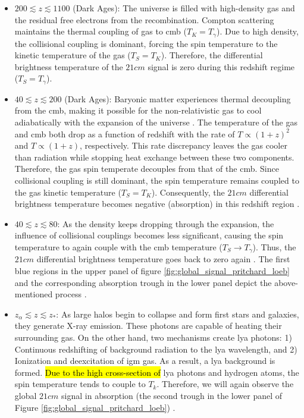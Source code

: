 \documentclass[12pt, TexShade, letterpaper]{report}
\begin{document}
\begin{itemize}
\item $200 \lesssim z \lesssim 1100$ (Dark Ages): The universe is filled with high-density gas and the residual free electrons from the recombination. Compton scattering maintains the thermal coupling of gas to \gls{cmb} ($T_K = T_\gamma$). Due to high density, the collisional coupling is dominant, forcing the spin temperature to the kinetic temperature of the gas ($T_S = T_K$). 
Therefore, the differential brightness temperature of the $21cm$ signal is zero during this redshift regime ($T_S = T_\gamma$)\cite{21century}.\par

\item $40 \lesssim z \lesssim 200$ (Dark Ages): Baryonic matter experiences thermal decoupling from the \gls{cmb}, making it possible for the non-relativistic gas to cool adiabatically with the expansion of the universe \cite{21century}. The temperature of the gas and \gls{cmb} both drop as a function of redshift with the rate of $T\propto (1+z)^{2}$ and $T\propto (1+z)$, respectively. This rate discrepancy leaves the gas cooler than radiation while stopping heat exchange between these two components. Therefore, the gas spin temperate decouples from that of the \gls{cmb}. Since collisional coupling is still dominant, the spin temperature remains coupled to the gas kinetic temperature ($T_S = T_K$). Consequently, the $21cm$ differential brightness temperature becomes negative (absorption) in this redshift region \cite{map_universe, 21century}.\par

\item $40 \lesssim z \lesssim 80$: As the density keeps dropping through the expansion, the influence of collisional couplings becomes less significant, causing the spin temperature to again couple with the \gls{cmb} temperature ($T_S \rightarrow T_\gamma$). Thus, the $21cm$ differential brightness temperature goes back to zero again \cite{map_universe}. The first blue regions in the upper panel of figure \ref{fig:global_signal_pritchard_loeb} and the corresponding absorption trough in the lower panel depict the above-mentioned process \cite{map_universe, 21century}.\par

\item $z_\alpha \lesssim z \lesssim z_*$: As large halos begin to collapse and form first stars and galaxies, they generate X-ray emission. These photons are capable of heating their surrounding gas. On the other hand, two mechanisms create \gls{lya} photons: 1) Continuous redshifting of background radiation to the \gls{lya} wavelength, and 2) Ionization and deexcitation of \gls{igm} gas. As a result, a \gls{lya} background is formed. \hl{Due to the high cross-section of} \gls{lya} photons and hydrogen atoms, the spin temperature tends to couple to $T_k$. Therefore, we will again observe the global $21cm$ signal in absorption (the second trough in the lower panel of Figure \ref{fig:global_signal_pritchard_loeb}) \cite{map_universe, 21century}.\par


\end{itemize}
\end{document}
